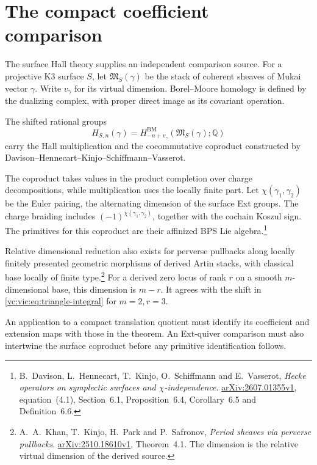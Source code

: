 \section{The compact coefficient comparison}
\label{vc:sec:compact}

The surface Hall theory supplies an independent comparison
source. For a projective K3 surface $S$, let
$\mathfrak M_S(\gamma)$ be the stack of coherent sheaves
of Mukai vector $\gamma$. Write $v_\gamma$ for its
virtual dimension. Borel--Moore homology is defined by
the dualizing complex, with proper direct image as its
covariant operation.

The shifted rational groups
\[
 H_{S,n}(\gamma)
 =H^{\mathrm{BM}}_{-n+v_\gamma}
       (\mathfrak M_S(\gamma);\mathbb Q)
\]
carry the Hall multiplication and the cocommutative
coproduct constructed by Davison--Hennecart--Kinjo--Schiffmann--Vasserot.

The coproduct takes values in the product
completion over charge decompositions, while multiplication
uses the locally finite part. Let $\chi(\gamma_1,\gamma_2)$
be the Euler pairing, the alternating dimension of the
surface Ext groups. The charge braiding includes
$(-1)^{\chi(\gamma_1,\gamma_2)}$, together with the
cochain Koszul sign. The primitives for this coproduct
are their affinized BPS Lie algebra.\footnote{
B.~Davison, L.~Hennecart, T.~Kinjo, O.~Schiffmann and
E.~Vasserot, \emph{Hecke operators on symplectic surfaces
and $\chi$-independence}.
\href{https://arxiv.org/abs/2607.01355v1}{arXiv:2607.01355v1},
equation~(4.1), Section~6.1, Proposition~6.4,
Corollary~6.5 and Definition~6.6.}

Relative dimensional reduction also exists for perverse
pullbacks along locally finitely presented geometric
morphisms of derived Artin stacks, with classical base
locally of finite type.\footnote{A.~A.~Khan, T.~Kinjo,
H.~Park and P.~Safronov, \emph{Period sheaves via perverse
pullbacks}.
\href{https://arxiv.org/abs/2510.18610v1}{arXiv:2510.18610v1},
Theorem~4.1. The dimension is the relative virtual dimension
of the derived source.}
For a derived zero locus of rank $r$ on a smooth
$m$-dimensional base, this dimension is $m-r$.
It agrees with the shift in
\eqref{vc:vic:eq:triangle-integral} for $m=2,r=3$.

An application to a compact translation quotient must
identify its coefficient and extension maps with those
in the theorem. An Ext-quiver comparison must also
intertwine the surface coproduct before any primitive
identification follows.

